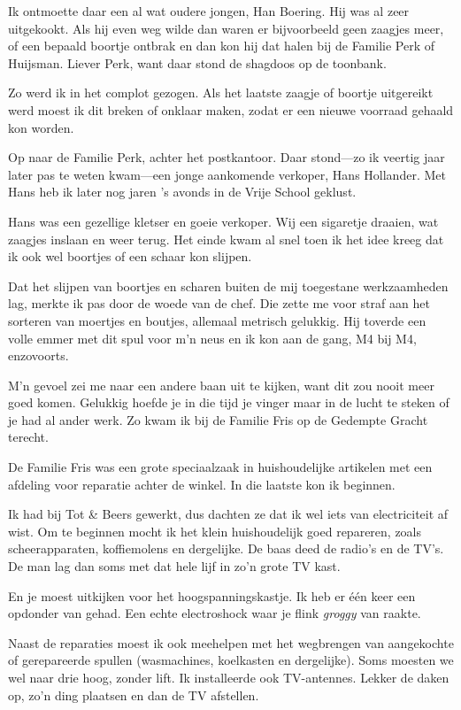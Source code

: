 \documentclass[12pt,twoside]{memoir}
\begin{document}
Ik ontmoette daar een al wat oudere jongen, Han Boering. Hij was al zeer uitgekookt. Als hij even weg wilde dan waren er bijvoorbeeld geen zaagjes meer, of een bepaald boortje ontbrak en dan kon hij dat halen bij de Familie Perk of Huijsman. Liever Perk, want daar stond de shagdoos op de toonbank. 

Zo werd ik in het complot gezogen. Als het laatste zaagje of boortje uitgereikt werd moest ik dit breken of onklaar maken, zodat er een nieuwe voorraad gehaald kon worden. 

Op naar de Familie Perk, achter het postkantoor. Daar stond---zo ik veertig jaar later pas te weten kwam---een jonge aankomende verkoper, Hans Hollander. Met Hans heb ik later nog jaren ’s avonds in de Vrije School geklust. 

Hans was een gezellige kletser en goeie verkoper. Wij een sigaretje draaien, wat zaagjes inslaan en weer terug. Het einde kwam al snel toen ik het idee kreeg dat ik ook wel boortjes of een schaar kon slijpen. 

Dat het slijpen van boortjes en scharen buiten de mij toegestane werkzaamheden lag, merkte ik pas door de woede van de chef. Die zette me voor straf aan het sorteren van moertjes en boutjes, allemaal metrisch gelukkig. Hij toverde een volle emmer met dit spul voor m’n neus en ik kon aan de gang, M4 bij M4, enzovoorts. 

M’n gevoel zei me naar een andere baan uit te kijken, want dit zou nooit meer goed komen. Gelukkig hoefde je in die tijd je vinger maar in de lucht te steken of je had al ander werk. Zo kwam ik bij de Familie Fris op de Gedempte Gracht terecht.

De Familie Fris was een grote speciaalzaak in huishoudelijke artikelen met een afdeling voor reparatie achter de winkel. In die laatste kon ik beginnen. 

Ik had bij Tot \& Beers gewerkt, dus dachten ze dat ik wel iets van electriciteit af wist. Om te beginnen mocht ik het klein huishoudelijk goed repareren, zoals scheerapparaten, koffiemolens en dergelijke. De baas deed de radio’s en de TV’s. De man lag dan soms met dat hele lijf in zo’n grote TV kast. 

En je moest uitkijken voor het hoogspanningskastje. Ik heb er één keer een opdonder van gehad. Een echte electroshock waar je flink \emph{groggy} van raakte.

Naast de reparaties moest ik ook meehelpen met het wegbrengen van aangekochte of gerepareerde spullen (wasmachines, koelkasten en dergelijke). Soms moesten we wel naar drie hoog, zonder lift. Ik installeerde ook TV-antennes. Lekker de daken op, zo’n ding plaatsen en dan de TV afstellen. 
\end{document}
